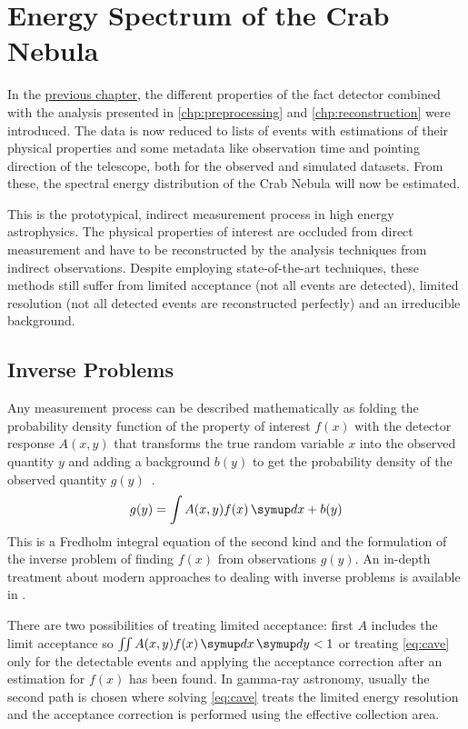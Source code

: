 \chapter{Energy Spectrum of the Crab Nebula}\label{chp:spectrum}

In the \hyperref[chp:performance]{previous chapter},
the different properties of the \gls{fact} detector combined with the analysis presented in \autoref{chp:preprocessing} and \autoref{chp:reconstruction} were introduced.
The data is now reduced to lists of events with estimations of their physical properties
and some metadata like observation time and pointing direction of the telescope,
both for the observed and simulated datasets.
From these, the spectral energy distribution of the Crab Nebula will now be estimated.

This is the prototypical, indirect measurement process in high energy astrophysics. 
The physical properties of interest are occluded from direct measurement and have
to be reconstructed by the analysis techniques from indirect observations.
Despite employing state-of-the-art techniques, these methods still suffer 
from limited acceptance (not all events are detected),
limited resolution (not all detected events are reconstructed perfectly)
and an irreducible background.

\section{Inverse Problems}
Any measurement process can be described mathematically as folding the
probability density function of the property of interest $f(x)$ with the 
detector response $A(x, y)$ that transforms the true random variable $x$ into
the observed quantity $y$ and adding a background $b(y)$ to get the probability
density of the observed quantity $g(y)$~\cite[Chapter~11]{blobel}.
\begin{equation}
  g(y) = \int A(x, y) f(x) \d{x} + b(y) \label{eq:cave}
\end{equation}
This is a Fredholm integral equation of the second kind and the formulation 
of the inverse problem of finding $f(x)$ from observations $g(y)$.
An in-depth treatment about modern approaches to dealing with inverse problems 
is available in \cite{benning-burger}.

There are two possibilities of treating limited acceptance:
first $A$ includes the limit acceptance so $\iint A(x, y) f(x) \d{x}\d{y} < 1$ or
treating \eqref{eq:cave} only for the detectable events and applying the acceptance
correction after an estimation for $f(x)$ has been found.
In gamma-ray astronomy, usually the second path is chosen where solving \eqref{eq:cave}
treats the limited energy resolution and the acceptance correction is performed
using the effective collection area.

